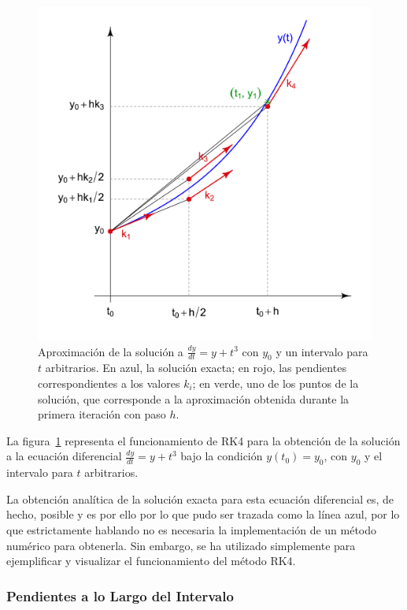 \documentclass[12pt, a4paper]{article}
\begin{document}
\begin{figure}[H]
	\centering
	\includegraphics[scale=0.6]{Runge-Kutta_slopes.png}
	\caption{Aproximación de la solución a \(\frac{dy}{dt} = y + t^{3}\) con \(y_{0}\) y un intervalo para \(t\) arbitrarios. En azul, la solución exacta; en rojo, las pendientes correspondientes a los valores \(k_{i}\); en verde, uno de los puntos de la solución, que corresponde a la aproximación obtenida durante la primera iteración con paso \(h\).}
	\label{fig:slopes}
\end{figure}
La figura~\ref{fig:slopes} representa el funcionamiento de RK4 para la obtención de la solución a la ecuación diferencial \(\frac{dy}{dt} = y + t^{3}\) bajo la condición \(y(t_{0}) = y_{0}\), con \(y_{0}\) y el intervalo para \(t\) arbitrarios.

La obtención analítica de la solución exacta para esta ecuación diferencial es, de hecho, posible y es por ello por lo que pudo ser trazada como la línea azul, por lo que estrictamente hablando no es necesaria la implementación de un método numérico para obtenerla. Sin embargo, se ha utilizado simplemente para ejemplificar y visualizar el funcionamiento del método RK4.

\subsubsection{Pendientes a lo Largo del Intervalo}
\end{document}
